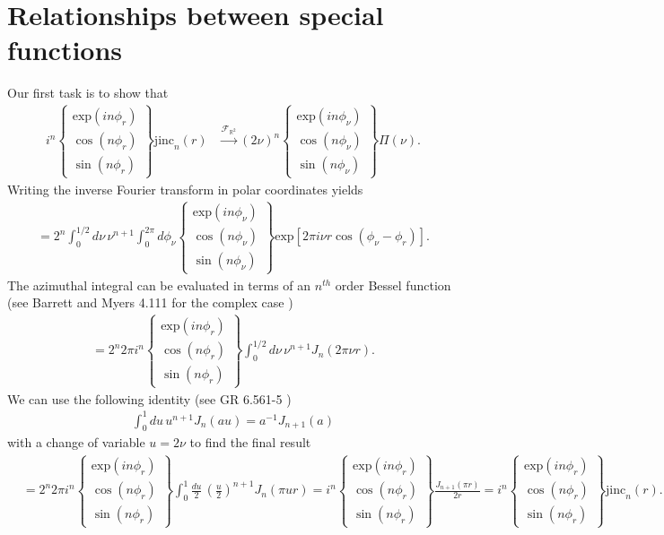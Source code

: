 \documentclass[]{osa-article}
\providecommand{\mbb}[1]{\mathbb{#1}}
\begin{document}
\section{Relationships between special functions} \label{sec:special}
Our first task is to show that 
\begin{align}
  i^{n}\left\{\substack{
  \text{exp}(in\phi_r)\\
    \cos(n\phi_r)\\
    \sin(n\phi_r)
  }\right\}\text{jinc}_{n}(r) &\stackrel{\mathcal{F}_{\mbb{R}^2}}{\longrightarrow}   (2\nu)^{n}\left\{\substack{
    \text{exp}(in\phi_{\nu})\\
    \cos(n\phi_{\nu})\\
    \sin(n\phi_{\nu})
  }\right\}\Pi(\nu). \label{eq:jincrect3}
  \end{align}
  Writing the inverse Fourier transform in polar coordinates yields
  \begin{align}
    =2^n\int_0^{1/2}d\nu\, \nu^{n+1}\int_0^{2\pi}d\phi_\nu\left\{\substack{
    \text{exp}(in\phi_{\nu})\\
    \cos(n\phi_{\nu})\\
    \sin(n\phi_{\nu})
  }\right\}\text{exp}[2\pi i\nu r\cos(\phi_\nu - \phi_r)].
  \end{align}
  The azimuthal integral can be evaluated in terms of an $n^{th}$ order Bessel
  function (see Barrett and Myers 4.111 for the complex case \cite{barrett2004})
  \begin{align}
    =2^n 2\pi i^n \left\{\substack{
    \text{exp}(in\phi_{r})\\
    \cos(n\phi_r)\\
    \sin(n\phi_r)
  }\right\}\int_0^{1/2}d\nu\, \nu^{n+1}J_n(2\pi\nu r).
  \end{align}
  We can use the following identity (see GR 6.561-5 \cite{gradshteyn2007})
  \begin{align}
    \int_0^1 du\, u^{n + 1}J_{n}(au) = a^{-1}J_{n + 1}(a)
  \end{align}
  with a change of variable $u = 2\nu$ to find the final result
  \begin{align}
    &=2^n 2\pi i^n \left\{\substack{
    \text{exp}(in\phi_{r})\\
    \cos(n\phi_r)\\
    \sin(n\phi_r)
  }\right\}\int_0^{1}\frac{du}{2}\, \left(\frac{u}{2}\right)^{n+1}J_n(\pi u r)
    =i^n \left\{\substack{
    \text{exp}(in\phi_{r})\\
    \cos(n\phi_r)\\
    \sin(n\phi_r)
  }\right\}\frac{J_{n+1}(\pi r)}{2r}
    =i^n \left\{\substack{
    \text{exp}(in\phi_{r})\\
    \cos(n\phi_r)\\
    \sin(n\phi_r)
  }\right\}\text{jinc}_{n}(r).
  \end{align}
\end{document}
